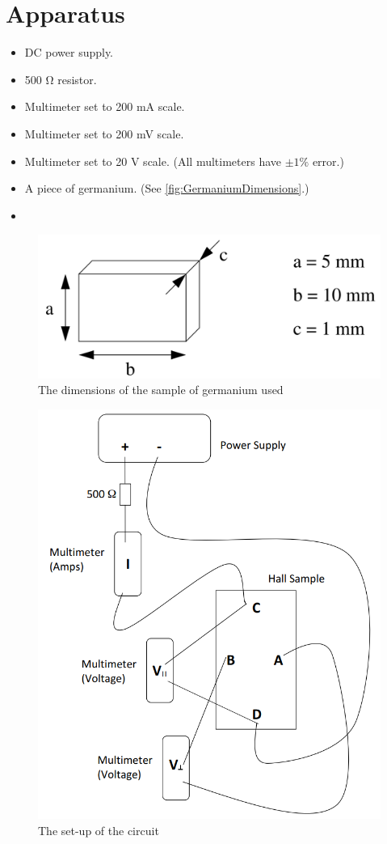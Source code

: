\documentclass[12pt]{article}
\numberwithin{equation}{section}
\numberwithin{figure}{section}
\numberwithin{table}{section}
\begin{document}
    \section{Apparatus}\label{sec:Apparatus}
    \begin{itemize}
        \item DC power supply.
        \item 500 $\si{\ohm}$ resistor.
        \item Multimeter set to 200 mA scale.
        \item Multimeter set to 200 mV scale. 
        \item Multimeter set to 20 V scale. (All multimeters have $\pm 1\%$ error.)
        \item A piece of germanium. (See \autoref{fig:GermaniumDimensions}.)
        \item 
    \end{itemize}
    \begin{figure}[H]
        \begin{center}
            \includegraphics[width=.4\textwidth]{GermaniumDimensions.png}
            \caption{The dimensions of the sample of germanium used}
            \label{fig:GermaniumDimensions}
        \end{center}
    \end{figure}
    \begin{figure}[H]
        \begin{center}
            \includegraphics[width=.65\textwidth]{CircuitDiagram.png}
            \caption{The set-up of the circuit}
            \label{fig:CircuitDiagram}
        \end{center}
    \end{figure}
    
    
\end{document}
